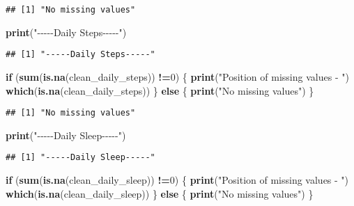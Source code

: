 \documentclass[
]{article}
\newenvironment{Shaded}{\begin{snugshade}}{\end{snugshade}}
\newcommand{\ControlFlowTok}[1]{\textcolor[rgb]{0.13,0.29,0.53}{\textbf{#1}}}
\newcommand{\DecValTok}[1]{\textcolor[rgb]{0.00,0.00,0.81}{#1}}
\newcommand{\FunctionTok}[1]{\textcolor[rgb]{0.13,0.29,0.53}{\textbf{#1}}}
\newcommand{\NormalTok}[1]{#1}
\newcommand{\SpecialCharTok}[1]{\textcolor[rgb]{0.81,0.36,0.00}{\textbf{#1}}}
\newcommand{\StringTok}[1]{\textcolor[rgb]{0.31,0.60,0.02}{#1}}
\begin{document}
\begin{verbatim}
## [1] "No missing values"
\end{verbatim}

\begin{Shaded}
\begin{Highlighting}[]
\FunctionTok{print}\NormalTok{(}\StringTok{"{-}{-}{-}{-}{-}Daily Steps{-}{-}{-}{-}{-}"}\NormalTok{)}
\end{Highlighting}
\end{Shaded}

\begin{verbatim}
## [1] "-----Daily Steps-----"
\end{verbatim}

\begin{Shaded}
\begin{Highlighting}[]
\ControlFlowTok{if}\NormalTok{ (}\FunctionTok{sum}\NormalTok{(}\FunctionTok{is.na}\NormalTok{(clean\_daily\_steps)) }\SpecialCharTok{!=}\DecValTok{0}\NormalTok{) \{}
  \FunctionTok{print}\NormalTok{(}\StringTok{"Position of missing values {-} "}\NormalTok{)}
  \FunctionTok{which}\NormalTok{(}\FunctionTok{is.na}\NormalTok{(clean\_daily\_steps))}
\NormalTok{\} }\ControlFlowTok{else}\NormalTok{ \{}
  \FunctionTok{print}\NormalTok{(}\StringTok{"No missing values"}\NormalTok{)}
\NormalTok{\}}
\end{Highlighting}
\end{Shaded}

\begin{verbatim}
## [1] "No missing values"
\end{verbatim}

\begin{Shaded}
\begin{Highlighting}[]
\FunctionTok{print}\NormalTok{(}\StringTok{"{-}{-}{-}{-}{-}Daily Sleep{-}{-}{-}{-}{-}"}\NormalTok{)}
\end{Highlighting}
\end{Shaded}

\begin{verbatim}
## [1] "-----Daily Sleep-----"
\end{verbatim}

\begin{Shaded}
\begin{Highlighting}[]
\ControlFlowTok{if}\NormalTok{ (}\FunctionTok{sum}\NormalTok{(}\FunctionTok{is.na}\NormalTok{(clean\_daily\_sleep)) }\SpecialCharTok{!=}\DecValTok{0}\NormalTok{) \{}
  \FunctionTok{print}\NormalTok{(}\StringTok{"Position of missing values {-} "}\NormalTok{)}
  \FunctionTok{which}\NormalTok{(}\FunctionTok{is.na}\NormalTok{(clean\_daily\_sleep))}
\NormalTok{\} }\ControlFlowTok{else}\NormalTok{ \{}
  \FunctionTok{print}\NormalTok{(}\StringTok{"No missing values"}\NormalTok{)}
\NormalTok{\}}
\end{Highlighting}
\end{Shaded}
\end{document}
